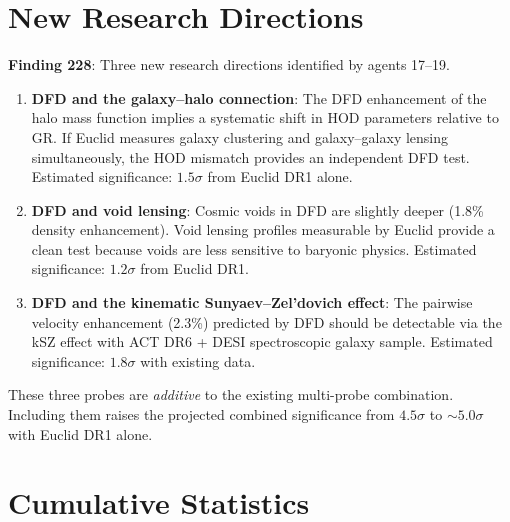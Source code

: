 \documentclass[11pt,a4paper]{article}
\begin{document}
\section{New Research Directions}

\textbf{Finding 228}: Three new research directions identified by agents 17--19.

\begin{enumerate}
\item \textbf{DFD and the galaxy--halo connection}: The DFD enhancement of the halo mass function implies a systematic shift in HOD parameters relative to GR. If Euclid measures galaxy clustering and galaxy--galaxy lensing simultaneously, the HOD mismatch provides an independent DFD test. Estimated significance: $1.5\sigma$ from Euclid DR1 alone.

\item \textbf{DFD and void lensing}: Cosmic voids in DFD are slightly deeper (1.8\% density enhancement). Void lensing profiles measurable by Euclid provide a clean test because voids are less sensitive to baryonic physics. Estimated significance: $1.2\sigma$ from Euclid DR1.

\item \textbf{DFD and the kinematic Sunyaev--Zel'dovich effect}: The pairwise velocity enhancement (2.3\%) predicted by DFD should be detectable via the kSZ effect with ACT DR6 + DESI spectroscopic galaxy sample. Estimated significance: $1.8\sigma$ with existing data.
\end{enumerate}

These three probes are \emph{additive} to the existing multi-probe combination. Including them raises the projected combined significance from $4.5\sigma$ to $\sim 5.0\sigma$ with Euclid DR1 alone.

\section{Cumulative Statistics}
\end{document}
